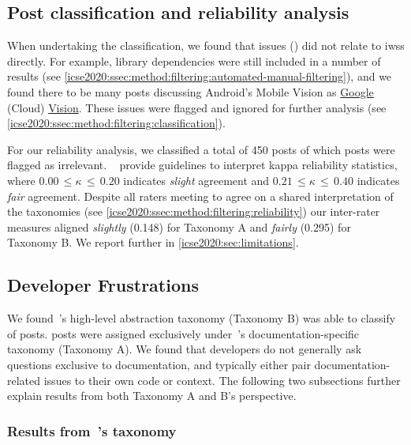 \subsection{Post classification and reliability analysis}
%
When undertaking the classification, we found that \NumPostsNoise{} issues (\PctPostsNoise{}) did not relate to \glspl{iws} directly. For example, library dependencies were still included in a number of results (see \cref{icse2020:ssec:method:filtering:automated-manual-filtering}), and we found there to be many posts  discussing Android's Mobile Vision  as \uline{Google} (Cloud) \uline{Vision}. These issues were flagged and ignored for further analysis (see \cref{icse2020:ssec:method:filtering:classification}).
%

For our reliability analysis, we classified a total of 450 posts of which \NumPostsFromFiftyNoise{} posts were flagged as irrelevant.
%
~\citet{Landis:1977kv} provide guidelines to interpret kappa reliability statistics, where $0.00\,\leq \kappa\,\leq\,0.20$ indicates \textit{slight} agreement and $0.21\,\leq \kappa\,\leq\,0.40$ indicates \textit{fair} agreement.
Despite all raters meeting to agree on a shared interpretation of the taxonomies (see \cref{icse2020:ssec:method:filtering:reliability}) our inter-rater measures aligned \textit{slightly} (0.148) for Taxonomy A and \textit{fairly} (0.295) for Taxonomy B. We report further in \cref{icse2020:sec:limitations}.

\subsection{Developer Frustrations}

We found~\citeauthor{Beyer:2018fm}'s high-level abstraction taxonomy (Taxonomy B) was able to classify \PctTaxBCategorised{} of posts.  \PctTaxACategorised{} posts were assigned exclusively under~\citeauthor{Aghajani:2019bo}'s documentation-specific taxonomy (Taxonomy A).
We found that developers do not generally ask questions exclusive to documentation, and typically either pair documentation-related issues to their own code or context. The following two subsections further explain results from both Taxonomy A and B's perspective.

\subsubsection[Results from Aghajani's taxonomy]{Results from~\citeauthor{Aghajani:2019bo}'s taxonomy}

